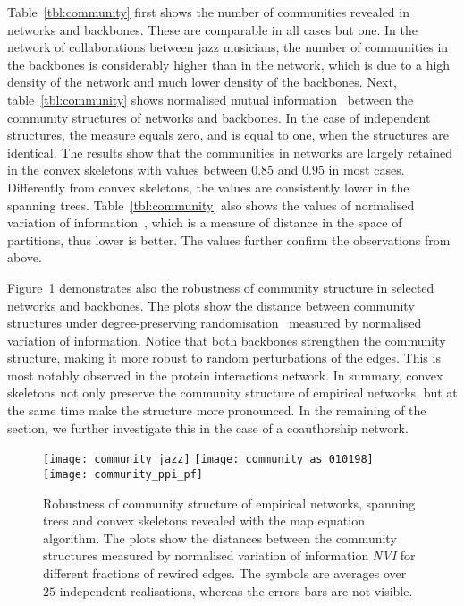 \documentclass[]{rsif}
\newcommand{\Figref}[1]{Figure~\ref{fig:#1}\xspace}
\newcommand{\tblref}[1]{table~\ref{tbl:#1}\xspace}
\newcommand{\Tblref}[1]{Table~\ref{tbl:#1}\xspace}
\begin{document}
\Tblref{community} first shows the number of communities revealed in networks and backbones. These are comparable in all cases but one. In the network of collaborations between jazz musicians, the number of communities in the backbones is considerably higher than in the network, which is due to a  high density of the network and much lower density of the backbones. Next, \tblref{community} shows normalised mutual information~\cite{DDDA05} between the community structures of networks and backbones. In the case of independent structures, the measure equals zero, and is equal to one, when the structures are identical. The results show that the communities in networks are largely retained in the convex skeletons with values between $0.85$ and $0.95$ in most cases. Differently from convex skeletons, the values are consistently lower in the spanning trees. \Tblref{community} also shows the values of normalised variation of information~\cite{Mei07}, which is a measure of distance in the space of partitions, thus lower is better. The values further confirm the observations from above.

\Figref{community} demonstrates also the robustness of community structure in selected networks and backbones. The plots show the distance between community structures under degree-preserving randomisation~\cite{MS02} measured by normalised variation of information. Notice that both backbones strengthen the community structure, making it more robust to random perturbations of the edges. This is most notably observed in the protein interactions network. In summary, convex skeletons not only preserve the community structure of empirical networks, but at the same time make the structure more pronounced. In the remaining of the section, we further investigate this in the case of a coauthorship network.

\begin{figure}[t]
	\centering\texttt{[image: community\_jazz]}\textwidth%
	\texttt{[image: community\_as\_010198]}\textwidth%
	\texttt{[image: community\_ppi\_pf]}%
	\caption{\label{fig:community}Robustness of community structure of empirical networks, spanning trees and convex skeletons revealed with the map equation algorithm. The plots show the distances between the community structures measured by normalised variation of information {\it NVI} for different fractions of rewired edges. The symbols are averages over $25$ independent realisations, whereas the errors bars are not visible.} 
\end{figure}
\end{document}
